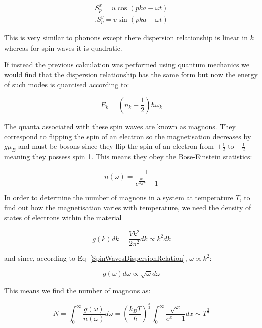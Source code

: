 \begin{eqnarray}
    S_p^x = u\cos(pka - \omega t) \\.
    S_p^y = v\sin(pka - \omega t)
\end{eqnarray}

\noindent This is very similar to phonons except there dispersion relationship is linear in $k$ whereas for spin waves it is quadratic.


If instead the previous calculation was performed using quantum mechanics we would find that the dispersion relationship has the same form but now the energy of such modes is quantised according to:

\begin{equation}
    E_k = (n_k + \frac{1}{2}) \hbar \omega_k
    \label{QuantisedModeSpinWave}
\end{equation}

\noindent The quanta associated with these spin waves are known as magnons. They correspond to flipping the spin of an electron so the magnetisation decreases by $g\mu_B$ and must be bosons since they flip the spin of an electron from $+\frac{1}{2}$ to $-\frac{1}{2}$ meaning they possess spin 1. This means they obey the Bose-Einstein statistics:

\begin{equation}
    n(\omega) = \frac{1}{e^{\frac{\hbar \omega}{k_B T}} - 1}
    \label{BoseEinsteinStatistics}
\end{equation}

\noindent In order to determine the number of magnons in a system at temperature $T$, to find out how the magnetisation varies with temperature, we need the density of states of electrons within the material

\begin{equation}
    g(k) dk = \frac{Vk^2}{2\pi^2} dk \propto k^2 dk
    \label{kDependenceDOS}
\end{equation}

\noindent and since, according to Eq~\ref{SpinWavesDispersionRelation}, $\omega \propto k^2$:

\begin{equation}
    g(\omega) d \omega \propto \sqrt{\omega} d\omega
    \label{omegaDependenceDOS}
\end{equation}

\noindent This means we find the number of magnons as:

\begin{equation}
    N = \int^\infty_0 \frac{g(\omega)}{n(\omega)} d\omega = (\frac{k_B T}{\hbar})^{\frac{3}{2}} \int^\infty_0 \frac{\sqrt{x}}{e^x - 1} dx \sim T^{\frac{3}{2}}
    \label{NumberMagnons}
\end{equation}

